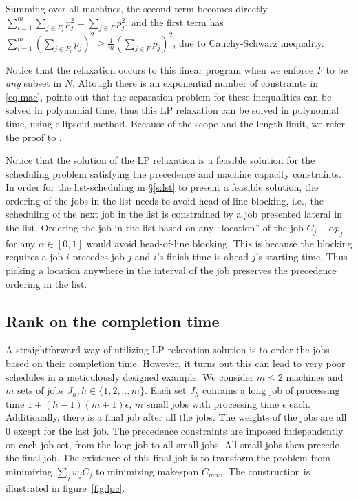 Summing over all machines, the second term becomes directly $\sum_{i=1}^m \sum_{j\in F_i}p_j^2 = \sum_{j\in F}p_j^2$, and the first term has $\sum_{i=1}^m\left(\sum_{j\in F_i} p_j\right)^2 \geq \frac{1}{m}\left(\sum_{j\in F} p_j\right)^2$, due to Cauchy-Schwarz inequality. 

Notice that the relaxation occurs to this linear program when we enforce $F$ to be \emph{any} subset in $N$. Altough there is an exponential number of constraints in \eqref{eq:mac}, \cite{queyranne2006approximation} points out that the separation problem for these inequalities can be solved in polynomial time, thus this LP relaxation can be solved in polynomial time, using ellipsoid method. Because of the scope and the length limit, we refer the proof to \cite{schulz1996scheduling}.

Notice that the solution of the LP relaxation is a feasible solution for the scheduling problem satisfying the precedence and machine capacity constraints. In order for the list-scheduling in \S\ref{s:lst} to present a feasible solution, the ordering of the jobs in the list needs to avoid head-of-line blocking, i.e., the scheduling of the next job in the list is constrained by a job presented lateral in the list. Ordering the job in the list based on any ``location'' of the job $C_j - \alpha p_j$ for any $\alpha \in [0,1]$ would avoid head-of-line blocking. This is because the blocking requires a job $i$ precedes job $j$ and $i$'s finish time is ahead $j$'s starting time. Thus picking a location anywhere in the interval of the job preserves the precedence ordering in the list.

\subsection{Rank on the completion time} \label{s:lpc}
A straightforward way of utilizing LP-relaxation solution is to order the jobs based on their completion time. However, it turns out this can lead to very poor schedules in a meticulously designed example. We consider $m \leq 2$ machines and $m$ sets of jobs $J_h, h\in\{1,2,..,m\}$. Each set $J_h$ contains a long job of processing time $1 + (h-1)(m+1)\epsilon$, $m$ small jobs with processing time $\epsilon$ each. Additionally, there is a final job after all the jobs. The weights of the jobs are all $0$ except for the last job. The precedence constraints are imposed independently on each job set, from the long job to all small jobs. All small jobs then precede the final job. The existence of this final job is to transform the problem from minimizing $\sum_jw_jC_j$ to minimizing makespan $C_{max}$. The construction is illustrated in figure~\ref{fig:lpc}.


